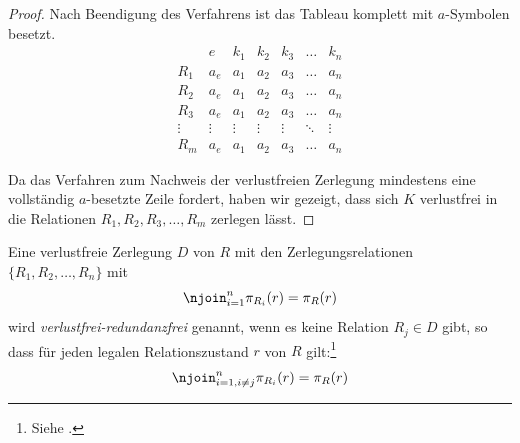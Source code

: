 \begin{proof}
    \noindent
    Nach Beendigung des Verfahrens ist das Tableau komplett mit $a$-Symbolen besetzt.
    \[
        \begin{array}{c|cccccc}
            & e      & k_1 & k_2 & k_3 & \dots  & k_n \\
            \hline
            R_{1}      & a_e     & a_1         & a_2         & a_3         & \dots  & a_n         \\
            R_{2}      & a_e     & a_1         & a_2         & a_3         & \dots  & a_n         \\
            R_{3}      & a_e     & a_1         & a_2         & a_3        & \dots  & a_n         \\
            \vdots          & \vdots & \vdots     & \vdots     & \vdots     & \ddots & \vdots     \\
            R_{m}      & a_e     & a_1         & a_2         & a_3         & \dots  & a_n
        \end{array}
    \]
    \medskip

    \noindent
    Da das Verfahren zum Nachweis der verlustfreien Zerlegung mindestens eine vollständig $a$-besetzte Zeile fordert, haben wir gezeigt, dass sich $K$ verlustfrei in die Relationen $R_{1}, R_{2}, R_{3}, \ldots, R_{m}$ zerlegen lässt.

\end{proof}
\bigskip


\begin{definition}\label{def:verlustfrei_redundanzfrei}
    Eine verlustfreie Zerlegung $D$ von $R$ mit den Zerlegungsrelationen $\{R_1, R_2, \ldots, R_n\}$ mit
    \[
        \njoin_{i=1}^n \pi_{R_i}(r) = \pi_{R}(r)
    \]
    wird \textit{verlustfrei-redundanzfrei} genannt, wenn es keine Relation $R_j \in D$ gibt, so dass für jeden legalen Relationszustand $r$ von $R$ gilt:\footnote{
        Siehe \cite[Definition 7]{Nor98}.
    }
    \[
        \njoin_{i=1, i \neq j}^n \pi_{R_i}(r) = \pi_{R}(r)
    \]

\end{definition}

